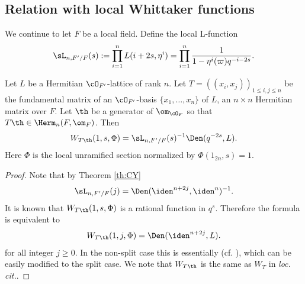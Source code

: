 \subsection{Relation with local Whittaker functions}\label{sec:relation-with-local} We continue to let $F$ be a local field.
Define the local L-function
\begin{equation*}
\sL_{n,F'/F}(s) :=\prod_{i=1}^nL(i+2s, \eta^i)=\prod_{i=1}^n\frac{1}{1-\eta^i (\varpi)q^{-i-2s}}.
\end{equation*}

\begin{lemma}
\notready\label{lem:Whi}
Let $L$ be a Hermitian $\cO_{F'}$-lattice of rank $n$. Let $T=((x_i, x_j))_{1\le i,j\le n}$ be the fundamental matrix of an $\cO_{F'}$-basis $\{x_1,\ldots, x_n\}$ of $L$, an $n\times n$ Hermitian matrix over $F$. Let $\th$ be a generator of $\om_{\cO_{F}}$ so that $T\th\in \Herm_{n}(F,\om_{F})$. Then
  \begin{align*}
W_{T\th}(1, s, \Phi)=\sL_{n,F'/F}(s)^{-1} \Den(q^{-2s},  L).
  \end{align*}
  Here $\Phi$ is the local unramified section normalized by $\Phi(1_{2n},s)=1$.
\end{lemma}
\begin{proof}
Note that by Theorem \ref{th:CY}
$$\sL_{n,F'/F}( j)=\Den(\iden^{n+2j},  \iden^{n})^{-1}. $$
It is known that $W_{T\th}(1, s, \Phi)$ is a rational function in $q^{s}$.
Therefore the formula is equivalent to
  \begin{align*}
W_{T\th}(1, j, \Phi)= \Den(\iden^{n+2j},  L).
  \end{align*}
  for all integer $j\geq 0$.
In the non-split case this is essentially \cite[Prop.~10.1]{KRII} (cf. \cite[\S3.3]{LZ1}), which can be easily modified to the split case. We note that $W_{T\th}$ is the same as $W_{T}$ in {\em loc. cit.}.
\end{proof}
%
%
%
%
